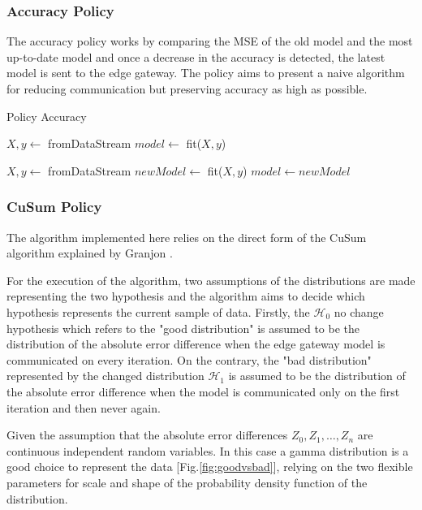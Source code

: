 \documentclass{mpaper}
\begin{document}
\subsubsection{Accuracy Policy}
The accuracy policy works by comparing the MSE of the old model and the most up-to-date model and once a decrease in the accuracy is detected, the latest model is sent to the edge gateway.
The policy aims to present a naive algorithm for reducing communication but preserving accuracy as high as possible.

\begin{algorithm}[h]
\caption{Policy Accuracy}\label{polA}
\begin{algorithmic}
\State $X, y \gets$ fromDataStream
\State $model \gets$ fit($X,y$)

    \State $X, y \gets$ fromDataStream
    \State $newModel \gets$ fit($X,y$)
        \State $model \gets newModel$ 
    \EndIf
\EndWhile
\end{algorithmic}
\end{algorithm}

\subsubsection{CuSum Policy}
The algorithm implemented here relies on the direct form of the CuSum algorithm explained by Granjon \cite{cusum_pierre}.

For the execution of the algorithm, two assumptions of the distributions are made representing the two hypothesis and the algorithm aims to decide which hypothesis represents the current sample of data. 
Firstly, the $\mathcal{H}_0$ no change hypothesis which refers to the "good distribution" is assumed to be the distribution of the absolute error difference when the edge gateway model is communicated on every iteration. On the contrary, the "bad distribution" represented by the changed distribution $\mathcal{H}_1$ is assumed to be the distribution of the absolute error difference when the model is communicated only on the first iteration and then never again.

Given the assumption that the absolute error differences $Z_0, Z_1, \dotsc , Z_n $ are continuous independent random variables. In this case a gamma distribution is a good choice to represent the data  [Fig.\ref{fig:goodvsbad}], relying on the two flexible parameters for scale and shape of the probability density function of the distribution.
\end{document}
